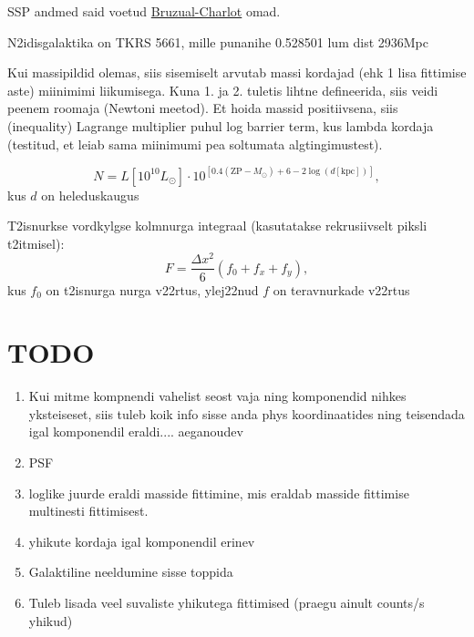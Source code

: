 \documentclass{article}
\begin{document}
	SSP andmed said voetud \href{http://www.bruzual.org/bc03/Updated_version_2016/}{Bruzual-Charlot} omad.
	
	N2idisgalaktika on TKRS 5661, mille punanihe 0.528501 lum dist 2936Mpc
	
	Kui massipildid olemas, siis sisemiselt arvutab massi kordajad (ehk 1 lisa fittimise aste) miinimimi liikumisega. Kuna 1. ja 2. tuletis lihtne defineerida, siis veidi peenem roomaja (Newtoni meetod). Et hoida massid positiivsena, siis (inequality) Lagrange multiplier puhul log barrier term, kus lambda kordaja (testitud, et leiab sama miinimumi pea soltumata algtingimustest).
	
	\begin{equation}
		N = L\left[ 10^{10}L_\odot \right] \cdot 10^{\left[ 0.4(\mathrm{ZP}-M_\odot) +6 - 2\log(d[\mathrm{kpc}]) \right]},
	\end{equation}
	kus $d$ on heleduskaugus
	
	T2isnurkse vordkylgse kolmnurga integraal (kasutatakse rekrusiivselt piksli t2itmisel):
	\begin{equation}
		F = \frac{\Delta x^2}{6}(f_0+f_x+f_y),
	\end{equation}
	kus $f_0$ on t2isnurga nurga v22rtus, ylej22nud $f$ on teravnurkade v22rtus
	
	\section{TODO} %
	\label{sec:todo}
	\begin{enumerate}
		\item Kui mitme kompnendi vahelist seost vaja ning komponendid nihkes yksteiseset, siis tuleb koik info sisse anda phys koordinaatides ning teisendada igal komponendil eraldi.... aeganoudev
		\item PSF
		\item loglike juurde eraldi masside fittimine, mis eraldab masside fittimise multinesti fittimisest.
		\item yhikute kordaja igal komponendil erinev
		\item Galaktiline neeldumine sisse toppida
		\item Tuleb lisada veel suvaliste yhikutega fittimised (praegu ainult counts/s yhikud)
	\end{enumerate}
\end{document}
